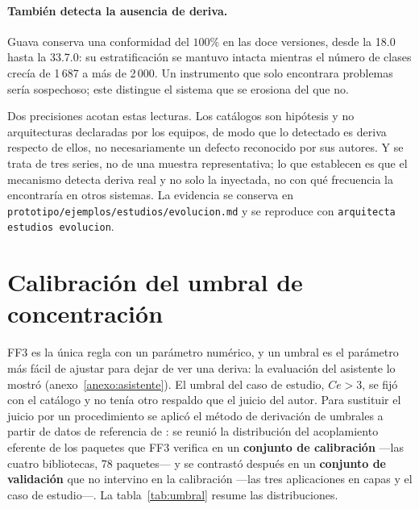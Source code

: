 \paragraph{También detecta la ausencia de deriva.} Guava conserva una conformidad del $100\%$ en las doce versiones, desde la 18.0 hasta la 33.7.0: su estratificación se mantuvo intacta mientras el número de clases crecía de 1\,687 a más de 2\,000. Un instrumento que solo encontrara problemas sería sospechoso; este distingue el sistema que se erosiona del que no.

Dos precisiones acotan estas lecturas. Los catálogos son hipótesis y no arquitecturas declaradas por los equipos, de modo que lo detectado es deriva respecto de ellos, no necesariamente un defecto reconocido por sus autores. Y se trata de tres series, no de una muestra representativa; lo que establecen es que el mecanismo detecta deriva real y no solo la inyectada, no con qué frecuencia la encontraría en otros sistemas. La evidencia se conserva en \texttt{prototipo/ejemplos/estudios/evolucion.md} y se reproduce con \texttt{arquitecta estudios evolucion}.

\section{Calibración del umbral de concentración}
\label{sec:umbral}
FF3 es la única regla con un parámetro numérico, y un umbral es el parámetro más fácil de ajustar para dejar de ver una deriva: la evaluación del asistente lo mostró (anexo~\ref{anexo:asistente}). El umbral del caso de estudio, $Ce > 3$, se fijó con el catálogo y no tenía otro respaldo que el juicio del autor. Para sustituir el juicio por un procedimiento se aplicó el método de derivación de umbrales a partir de datos de referencia de \citet{Alves2010}: se reunió la distribución del acoplamiento eferente de los paquetes que FF3 verifica en un \textbf{conjunto de calibración} ---las cuatro bibliotecas, 78 paquetes--- y se contrastó después en un \textbf{conjunto de validación} que no intervino en la calibración ---las tres aplicaciones en capas y el caso de estudio---. La tabla~\ref{tab:umbral} resume las distribuciones.

